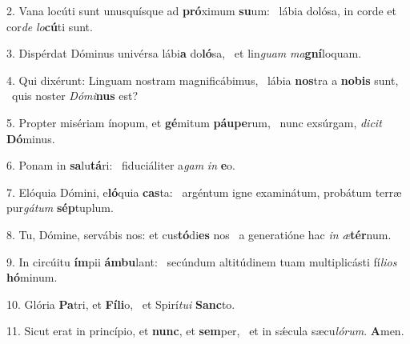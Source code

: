 2. Vana locúti sunt unusquísque ad \textbf{pró}ximum \textbf{su}um: \ast\  lábia dolósa, in corde et cor\textit{de} \textit{lo}\textbf{cú}ti sunt.\

3. Dispérdat Dóminus univérsa lábi\textbf{a} do\textbf{ló}sa, \ast\  et lin\textit{guam} \textit{ma}\textbf{gní}loquam.\

4. Qui dixérunt: Linguam nostram magnificábimus, \dag\  lábia \textbf{nos}tra a \textbf{no}\textbf{bis} sunt, \ast\  quis noster \textit{Dó}\textit{mi}\textbf{nus} est?\

5. Propter misériam ínopum, et \textbf{gé}mitum \textbf{páu}\textbf{pe}rum, \ast\  nunc exsúrgam, \textit{di}\textit{cit} \textbf{Dó}minus.\

6. Ponam in \textbf{sa}lu\textbf{tá}ri: \ast\  fiduciáliter a\textit{gam} \textit{in} \textbf{e}o.\

7. Elóquia Dómini, e\textbf{ló}quia \textbf{cas}ta: \ast\  argéntum igne examinátum, probátum terræ pur\textit{gá}\textit{tum} \textbf{sép}tuplum.\

8. Tu, Dómine, servábis nos: et cus\textbf{tó}di\textbf{es} nos \ast\  a generatióne hac \textit{in} \textit{æ}\textbf{tér}num.\

9. In circúitu \textbf{ím}pii \textbf{ám}\textbf{bu}lant: \ast\  secúndum altitúdinem tuam multiplicásti fí\textit{li}\textit{os} \textbf{hó}minum.\

10. Glória \textbf{Pa}tri, et \textbf{Fí}\textbf{li}o, \ast\  et Spirí\textit{tu}\textit{i} \textbf{Sanc}to.\

11. Sicut erat in princípio, et \textbf{nunc}, et \textbf{sem}per, \ast\  et in sǽcula sæcu\textit{ló}\textit{rum}. \textbf{A}men.\

